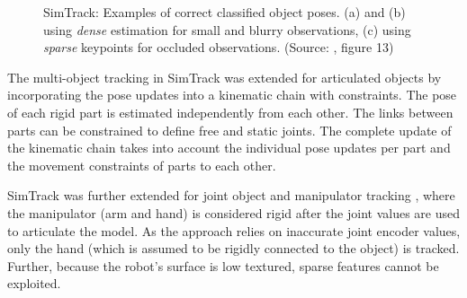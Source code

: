 \begin{figure}[h]
\centering
{}
\caption[SimTrack object tracking]{SimTrack: Examples of correct classified object poses. (a) and (b) using \textit{dense} estimation for small and blurry observations, (c) using \textit{sparse} keypoints for occluded observations. (Source: \cite{Pauwels2015}, figure 13)}
\label{fig:simtrack_poses}
\end{figure}

The multi-object tracking in SimTrack was extended for articulated objects \cite{Pauwels2014} by incorporating the pose updates into a kinematic chain with constraints. The pose of each rigid part is estimated independently from each other. The links between parts can be constrained to define free and static joints. The complete update of the kinematic chain takes into account the individual pose updates per part and the movement constraints of parts to each other.

SimTrack was further extended for joint object and manipulator tracking \cite{Pauwels2014b}, where the manipulator (arm and hand) is considered rigid after the joint values are used to articulate the model. As the approach relies on inaccurate joint encoder values, only the hand (which is assumed to be rigidly connected to the object) is tracked. Further, because the robot's surface is low textured, sparse features cannot be exploited.

